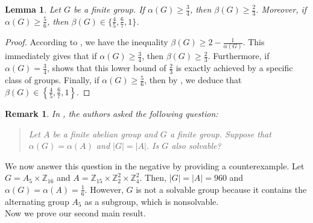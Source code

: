 \documentclass[a4paper,11pt]{amsart}
\numberwithin{equation}{section}
\numberwithin{equation}{subsection}
\newtheorem{lemma}[theorem]{Lemma}
\newtheorem{remark}[theorem]{Remark}
\begin{document}
\begin{lemma}\label{lemma4.4}
    Let $G$ be a finite group. If $\alpha(G)\ge \frac{3}{4}$, then $\beta(G)\ge \frac{2}{3}$. Moreover, if $\alpha(G)\ge \frac{5}{6}$, then $\beta(G)\in\{ \frac{4}{5},\frac{6}{7},1\}$.
\end{lemma}
\begin{proof}
    According to \cite[2.2]{GL}, we have the inequality $\beta(G) \ge 2 - \frac{1}{\alpha(G)}$. This immediately gives that if $\alpha(G) \ge \frac{3}{4}$, then $\beta(G) \ge \frac{2}{3}$. Furthermore, if $\alpha(G) = \frac{3}{4}$, \cite[Main Theorem]{GS} shows that this lower bound of $\frac{2}{3}$ is exactly achieved by a specific class of groups. Finally, if $\alpha(G) \ge \frac{5}{6}$, then by \cite[Corollary 2]{GL}, we deduce that $\beta(G) \in \left\{ \frac{4}{5}, \frac{6}{7}, 1 \right\}$.
\end{proof}

    

\begin{remark}\label{remark}
    In \cite{GS}, the authors asked the following question:
    \begin{quote}
    Let $A$ be a finite abelian group and $G$ a finite group. Suppose that $\alpha(G) = \alpha(A)$ and $|G| = |A|$. Is $G$ also solvable?
\end{quote}
\end{remark}



We now answer this question in the negative by providing a counterexample. Let $G = A_5 \times \mathbb{Z}_{16}$ and $A = \mathbb{Z}_{15} \times \mathbb{Z}_2^2 \times \mathbb{Z}_4^2$. Then, $|G| = |A| = 960$ and $\alpha(G) = \alpha(A) = \frac{1}{6}$. However, $G$ is not a solvable group because it contains the alternating group $A_5$ as a subgroup, which is nonsolvable.\\

Now we prove our second main result.\\
\end{document}
